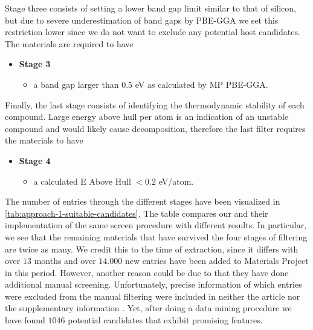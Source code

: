 \noindent Stage three consists of setting a lower band gap limit similar to that of silicon, but due to severe underestimation of band gaps by PBE-GGA we set this restriction lower since we do not want to exclude any potential host candidates. The materials are required to have
\begin{itemize}
  \item[]{\textbf{Stage 3}}
  \begin{itemize}
  \item a band gap larger than $0.5$ eV as calculated by MP PBE-GGA.
  \end{itemize}
\end{itemize}

\noindent Finally, the last stage consists of identifying the thermodynamic stability of each compound. Large energy above hull per atom is an indication of an unstable compound and would likely cause decomposition, therefore the last filter requires the materials to have

\begin{itemize}
  \item[]{\textbf{Stage 4}}
  \begin{itemize}
  \item a calculated E Above Hull $<0.2$ eV/atom.
  \end{itemize}
\end{itemize}

\noindent The number of entries through the different stages have been visualized in \autoref{tab:approach-1-suitable-candidates}. The table compares our and their implementation of the same screen procedure with different results. In particular, we see that the remaining materials that have survived the four stages of filtering are twice as many. We credit this to the time of extraction, since it differs with over $13$ months and over $14.000$ new entries have been added to Materials Project in this period. However, another reason could be due to that they have done additional manual screening. Unfortunately, precise information of which entries were excluded from the manual filtering were included in neither the article nor the supplementary information \cite{Ferrenti2020}. Yet, after doing a data mining procedure we have found $1046$ potential candidates that exhibit promising features.

